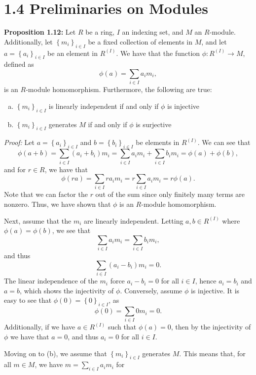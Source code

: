 \documentclass[12pt]{article}
\newcommand{\braceb}[1]{\left\{#1\right\}}
\newcommand{\proof}{\textit{Proof: }}
\begin{document}
\section*{1.4 Preliminaries on Modules}

\textbf{Proposition 1.12:}
Let \( R \) be a ring, \( I \) an indexing set, and \( M \) an \( R \)-module.
Additionally, let \( \braceb{m_i}_{i \in I} \) be a fixed collection of
elements in \( M \), and let \( a = \braceb{a_i}_{i \in I} \) be an element in
\( R^{(I)} \).
We have that the function \( \phi : R^{(I)} \to M \), defined as
\[
	\phi(a) = \sum_{i \in I} a_im_i,
\]
is an \( R \)-module homomorphism.
Furthermore, the following are true:
\begin{enumerate}[(a)]
	\item \( \braceb{m_i}_{i \in I} \) is linearly independent if and only if
	      \( \phi \) is injective

	\item \( \braceb{m_i}_{i \in I} \) generates \( M \) if and only if
	      \( \phi \) is surjective
\end{enumerate}

\proof
Let \( a = \braceb{a_i}_{i \in I} \) and \( b = \braceb{b_i}_{i \in I} \) be
elements in \( R^{(I)} \).
We can see that
\[
	\phi(a + b)
	= \sum_{i \in I} (a_i + b_i)m_i
	= \sum_{i \in I} a_im_i + \sum_{i \in I} b_im_i
	= \phi(a) + \phi(b),
\]
and for \( r \in R \), we have that
\[
	\phi(ra)
	= \sum_{i \in I} ra_im_i
	= r\sum_{i \in I} a_im_i
	= r\phi(a).
\]
Note that we can factor the \( r \) out of the sum since only finitely many
terms are nonzero.
Thus, we have shown that \( \phi \) is an \( R \)-module homomorphism.

Next, assume that the \( m_i \) are linearly independent.
Letting \( a, b \in R^{(I)} \) where \( \phi(a) = \phi(b) \), we see that
\[
	\sum_{i \in I} a_im_i = \sum_{i \in I} b_im_i,
\]
and thus
\[
	\sum_{i \in I} (a_i - b_i)m_i = 0.
\]
The linear independence of the \( m_i \) force \( a_i - b_i = 0 \) for all
\( i \in I \), hence \( a_i = b_i \) and \( a = b \), which shows the
injectivity of \( \phi \).
Conversely, assume \( \phi \) is injective.
It is easy to see that \( \phi(0) = \braceb{0}_{i \in I} \), as
\[
	\phi(0) = \sum_{i \in I} 0m_i = 0.
\]
Additionally, if we have \( a \in R^{(I)} \) such that \( \phi(a) = 0 \), then
by the injectivity of \( \phi \) we have that \( a = 0 \), and thus
\( a_i = 0 \) for all \( i \in I \).

Moving on to (b), we assume that \( \braceb{m_i}_{i \in I} \) generates
\( M \).
This means that, for all \( m \in M \), we have \( m = \sum_{i \in I} a_im_i \)
for
\end{document}
